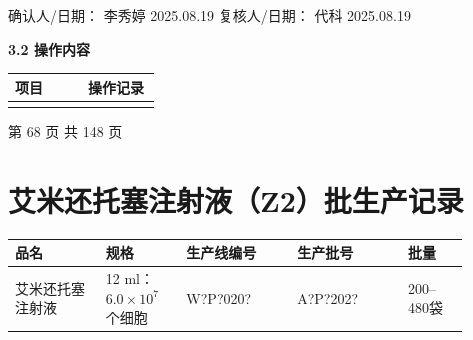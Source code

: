 \documentclass[UTF8,10pt,a4paper,fontset=fandol]{ctexart}
\newcommand{\fieldvalue}[1]{#1}
\newcommand{\handwritten}[1]{#1}
\begin{document}
\normalsize
\vspace{0.5em}

确认人/日期：
\fieldvalue{\handwritten{李秀婷}}
\quad
\fieldvalue{\handwritten{2025.08.19}}
\hfill
复核人/日期：
\fieldvalue{\handwritten{代科}}
\quad
\fieldvalue{\handwritten{2025.08.19}}

\vspace{0.5em}
\noindent\textbf{3.2 操作内容}

\begin{tabular}{|p{0.48\linewidth}|p{0.48\linewidth}|}
\hline
项目 & 操作记录 \\
\hline
\multicolumn{2}{|l|}{\rule{0pt}{2.5em}} \\
\hline
\end{tabular}

\vfill
\begin{center}
第 68 页 共 148 页
\end{center}

\newpage

\section*{艾米还托塞注射液（Z2）批生产记录}

\noindent
\begin{tabular}{|p{0.18\linewidth}|p{0.16\linewidth}|p{0.22\linewidth}|p{0.22\linewidth}|p{0.12\linewidth}|}
\hline
品名 & 规格 & 生产线编号 & 生产批号 & 批量 \\
\hline
\fieldvalue{艾米还托塞注射液}
&
\fieldvalue{12 ml：$6.0\times10^{7}$个细胞}
&
\fieldvalue{\handwritten{W?P?020?}}
&
\fieldvalue{\handwritten{A?P?202?}}
&
\fieldvalue{200--480袋}
\\
\hline
\end{tabular}

\medskip
\end{document}
